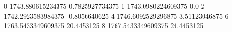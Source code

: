 0 1743.880615234375 0.7825927734375
1 1743.0980224609375 0.0
2 1742.2923583984375 -0.8056640625
4 1746.6092529296875 3.51123046875
6 1763.5433349609375 20.4453125
8 1767.5433349609375 24.4453125
